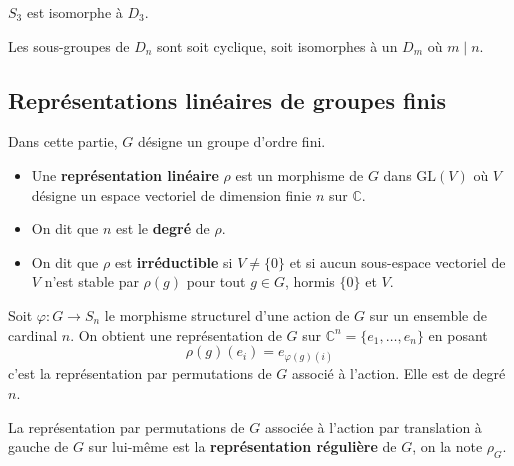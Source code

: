   \begin{example}
    $S_3$ est isomorphe à $D_3$.
  \end{example}


  \begin{proposition}
    Les sous-groupes de $D_n$ sont soit cyclique, soit isomorphes à un $D_m$ où $m \mid n$.
  \end{proposition}

  \subsection{Représentations linéaires de groupes finis}


  Dans cette partie, $G$ désigne un groupe d'ordre fini.

  \begin{definition}
    \begin{itemize}
      \item Une \textbf{représentation linéaire} $\rho$ est un morphisme de $G$ dans $\mathrm{GL}(V)$ où $V$ désigne un espace vectoriel de dimension finie $n$ sur $\mathbb{C}$.
      \item On dit que $n$ est le \textbf{degré} de $\rho$.
      \item On dit que $\rho$ est \textbf{irréductible} si $V \neq \{ 0 \}$ et si aucun sous-espace vectoriel de $V$ n'est stable par $\rho(g)$ pour tout $g \in G$, hormis $\{ 0 \}$ et $V$.
    \end{itemize}
  \end{definition}

  \begin{example}
    Soit $\varphi : G \rightarrow S_n$ le morphisme structurel d'une action de $G$ sur un ensemble de cardinal $n$. On obtient une représentation de $G$ sur $\mathbb{C}^n = \{ e_1, \dots, e_n \}$ en posant
    \[ \rho(g)(e_i) = e_{\varphi(g)(i)} \]
    c'est la représentation par permutations de $G$ associé à l'action. Elle est de degré $n$.
  \end{example}

  \begin{definition}
    La représentation par permutations de $G$ associée à l'action par translation à gauche de $G$ sur lui-même est la \textbf{représentation régulière} de $G$, on la note $\rho_G$.
  \end{definition}


